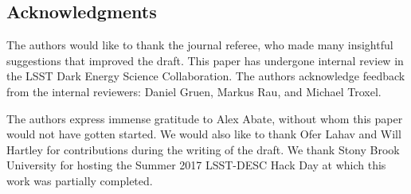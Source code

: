 \documentclass[\docopts]{\docclass}
\begin{document}















\subsection*{Acknowledgments}

The authors would like to thank the journal referee, who made many insightful suggestions that improved the draft.
This paper has undergone internal review in the LSST Dark Energy Science Collaboration.
The authors acknowledge feedback from the internal reviewers: Daniel Gruen, Markus Rau, and Michael Troxel. %




The authors express immense gratitude to Alex Abate, without whom this paper would not have gotten started.  We would also like to thank Ofer Lahav and Will Hartley for contributions during the writing of the draft.
We thank Stony Brook University for hosting the Summer 2017 LSST-DESC Hack Day at which this work was partially completed.
\end{document}

